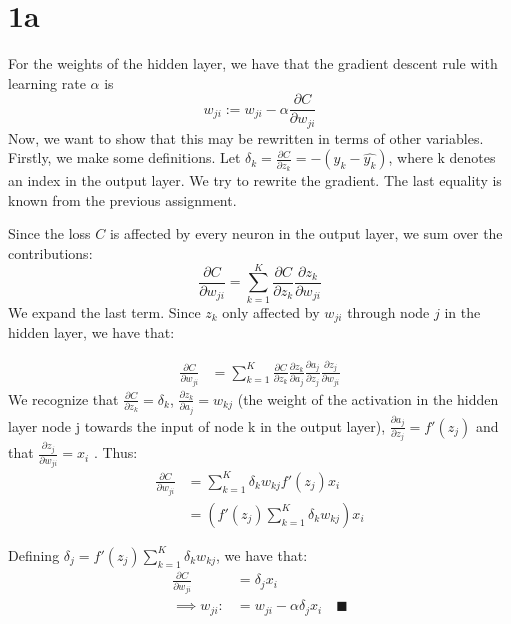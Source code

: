 \documentclass[a4paper]{article}
\begin{document}
\section*{1a}
For the weights of the hidden layer, we have that the gradient descent rule with learning rate $\alpha$ is 
$$
w_{ji} := w_{ji} - \alpha \frac{\partial C}{\partial w_{ji}}
$$
Now, we want to show that this may be rewritten in terms of other variables. Firstly, we make some definitions. Let $\delta_k = \frac{\partial C}{\partial z_k} = -(y_k - \hat{y_k})$, where k denotes an index in the output layer. We try to rewrite the gradient. The last equality is known from the previous assignment. 

Since the loss $C$ is affected by every neuron in the output layer, we sum over the contributions:
$$
\frac{\partial C}{\partial w_{ji}} = \sum_{k=1}^K \frac{\partial C}{\partial z_k} \frac{\partial z_k}{\partial w_{ji}}
$$
We expand the last term. Since $z_k$ only affected by $w_{ji}$ through node $j$ in the hidden layer, we have that:

$$
\begin{aligned}
	\frac{\partial C}{\partial w_{ji}} &= \sum_{k=1}^K \frac{\partial C}{\partial z_k} \frac{\partial z_k}{\partial a_j} \frac{\partial a_j}{\partial z_j} \frac{\partial z_j}{\partial w_{ji}}
\end{aligned}
$$
We recognize that $\frac{\partial C}{\partial z_k} = \delta_k$, $\frac{\partial z_k}{\partial a_j} = w_{kj}$ (the weight of the activation in the hidden layer node j towards the input of node k in the output layer), $\frac{\partial a_j}{\partial z_j} = f'(z_j)$ and that $\frac{\partial z_j}{\partial w_{ji}} = x_i$ . 
Thus:
$$
\begin{aligned}
	\frac{\partial C}{\partial w_{ji}} &= \sum_{k=1}^K \delta_k w_{kj} f'(z_j) x_i \\
	&= (f'(z_j) \sum_{k=1}^K \delta_k w_{kj} )x_i
\end{aligned}
$$

Defining $\delta_j = f'(z_j)\sum_{k=1}^K \delta_k w_{kj}$, we have that: 
$$
\begin{aligned}
	\frac{\partial C}{\partial w_{ji}} &= \delta_j x_i \\
	\implies w_{ji} :&= w_{ji} - \alpha \delta_j x_i \quad \blacksquare
\end{aligned}
$$
\end{document}
